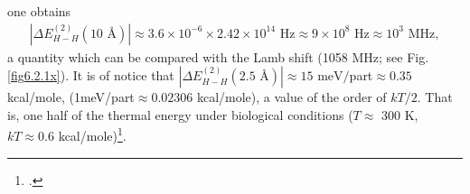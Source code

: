 \begin{subappendices}
 one obtains
\begin{align}\label{eq2.D.21}
|\Delta E_{H-H}^{(2)}(10\text{ \AA})|\approx3.6\times 10^{-6}\times 2.42\times 10^{14}\text{ Hz}\approx9\times10^8\text{ Hz}\approx10^3\text{ MHz},      
\end{align} 
 a quantity which can be compared with the Lamb shift (1058 MHz; see Fig. \ref{fig6.2.1x}). It is of notice that $|\Delta E_{H-H}^{(2)}(2.5\text{ \AA})|\approx15\text{ meV}/$part$\approx0.35$ kcal/mole, (1meV/part$\approx0.02306$ kcal/mole), a value of the order of $kT/2$. That is, one half of the thermal energy under biological conditions ($T\approx$ 300 K, $kT\approx 0.6$ kcal/mole)\footnote{\cite{Huang:05}.}.

\end{subappendices}
